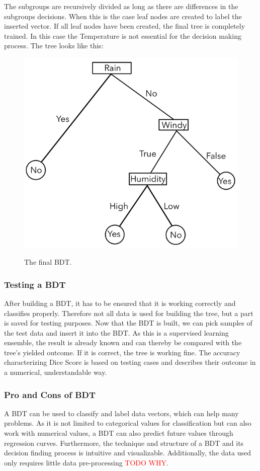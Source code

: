 \documentclass[
12pt,
headsepline,
bibliography=totoc,
twoside=semi,
fleqn
]{scrartcl}
\begin{document}
 The subgroups are recursively divided as long as there are differences in the subgroups decisions. When this is the case leaf nodes are created to label the inserted vector. If all leaf nodes have been created, the final tree is completely trained. In this case the Temperature is not essential for the decision making process. The tree looks like this:  
 \newpage
 \begin{figure}[H]
    \centering\includegraphics[scale=0.7]{BDT11.png}\label{fig:fig11}
    \caption{The final BDT.} 
 \end{figure}



 \subsubsection{Testing a BDT\label{sec:sec2-1-4}}
 After building a BDT, it has to be ensured that it is working correctly and classifies properly. Therefore not all data is used for building the tree, but a part is saved for testing purposes. Now that the BDT is built, we can pick samples of the test data and insert it into the BDT. As this is a supervised learning ensemble, the result is already known and can thereby be compared with the tree's yielded outcome. If it is correct, the tree is working fine. The accuracy characterizing Dice Score is based on testing cases and describes their outcome in a numerical, understandable way. 

 \subsubsection{Pro and Cons of BDT\label{sec:sec2-1-5}}
 A BDT can be used to classify and label data vectors, which can help many problems. As it is not limited to categorical values for classification but can also work with numerical values, a BDT can also predict future values through regression curves. Furthermore, the technique and structure of a BDT and its decision finding process is intuitive and visualizable. Additionally, the data used only requires little data pre-processing \textcolor{red}{TODO WHY}.
\end{document}
